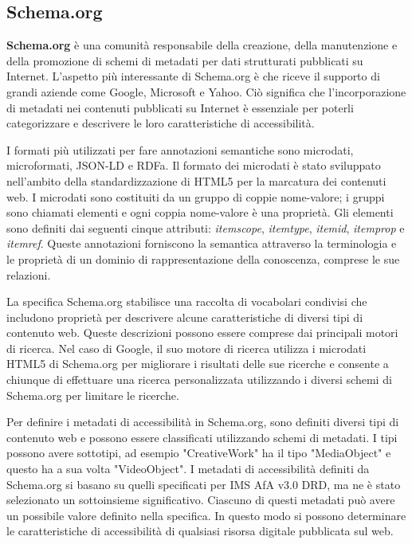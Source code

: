 \subsection{Schema.org}
\textbf{Schema.org} è una comunità responsabile della creazione, della manutenzione e della promozione di schemi di metadati per dati strutturati pubblicati su Internet. L'aspetto più interessante di Schema.org è che riceve il supporto di grandi aziende come Google, Microsoft e Yahoo. Ciò significa che l'incorporazione di metadati nei contenuti pubblicati su Internet è essenziale per poterli categorizzare e descrivere le loro caratteristiche di accessibilità.

I formati più utilizzati per fare annotazioni semantiche sono microdati, microformati, JSON-LD e RDFa.
Il formato dei microdati è stato sviluppato nell'ambito della standardizzazione di HTML5 per la marcatura dei contenuti web. I microdati sono costituiti da un gruppo di coppie nome-valore; i gruppi sono chiamati elementi e ogni coppia nome-valore è una proprietà. Gli elementi sono definiti dai seguenti cinque attributi: \textit{itemscope}, \textit{itemtype}, \textit{itemid}, \textit{itemprop} e \textit{itemref}. Queste annotazioni forniscono la semantica attraverso la terminologia e le proprietà di un dominio di rappresentazione della conoscenza, comprese le sue relazioni.

La specifica Schema.org stabilisce una raccolta di vocabolari condivisi che includono proprietà per descrivere alcune caratteristiche di diversi tipi di contenuto web. Queste descrizioni possono essere comprese dai principali motori di ricerca. Nel caso di Google, il suo motore di ricerca utilizza i microdati HTML5 di Schema.org per migliorare i risultati delle sue ricerche e consente a chiunque di effettuare una ricerca personalizzata utilizzando i diversi schemi di Schema.org per limitare le ricerche.

Per definire i metadati di accessibilità in Schema.org, sono definiti diversi tipi di contenuto web e possono essere
classificati utilizzando schemi di metadati.
I tipi possono avere sottotipi, ad esempio "CreativeWork" ha il tipo "MediaObject" e questo ha a sua volta "VideoObject".
I metadati di accessibilità definiti da Schema.org si basano su quelli specificati per IMS AfA v3.0 DRD, ma ne è stato selezionato un sottoinsieme significativo. Ciascuno di questi metadati può avere un possibile valore definito nella specifica. In questo modo si possono determinare le caratteristiche di accessibilità di qualsiasi risorsa digitale pubblicata sul web.

